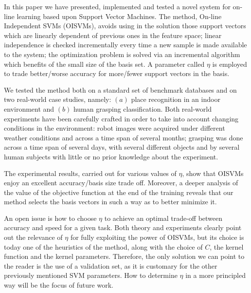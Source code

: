 In this paper we have presented, implemented and tested a novel system
for on-line learning based upon Support Vector Machines. The method,
On-line Independent SVMs (OISVMs), avoids using in the solution those
support vectors which are linearly dependent of previous ones in the
feature space; linear independence is checked incrementally every time
a new sample is made available to the system; the optimization problem
is solved via an incremental algorithm which benefits of the small size
of the basis set. A parameter called $\eta$ is employed to trade
better/worse accuracy for more/fewer support vectors in the basis.

We tested the method both on a standard set of benchmark databases and
on two real-world case studies, namely: $(a)$ place recognition in an
indoor environment and $(b)$ human grasping classification. Both
real-world experiments have been carefully crafted in order to take
into account changing conditions in the environment: robot images were
acquired under different weather conditions and across a time span of
several months; grasping was done across a time span of several days,
with several different objects and by several human subjects with
little or no prior knowledge about the experiment.

The experimental results, carried out for various values of $\eta$,
show that OISVMs enjoy an excellent accuracy/basis size trade
off. Moreover, a deeper analysis of the value of the objective
function at the end of the training reveals that our method
selects the basis vectors in such a way as to better minimize
it.


An open issue is how to choose $\eta$ to achieve an optimal trade-off
between accuracy and speed for a given task. Both theory and experiments
clearly point out the relevance of $\eta$ for fully exploiting the power of
OISVMs, but its choice is today one of the heuristics of the method, along with
the choice of $C$, the kernel function and the kernel parameters. Therefore,
the only solution we can point to the reader is the use of a validation set,
as it is customary for the other previously mentioned SVM parameters.
How to determine $\eta$ in a more principled way will be the focus of future
work.

